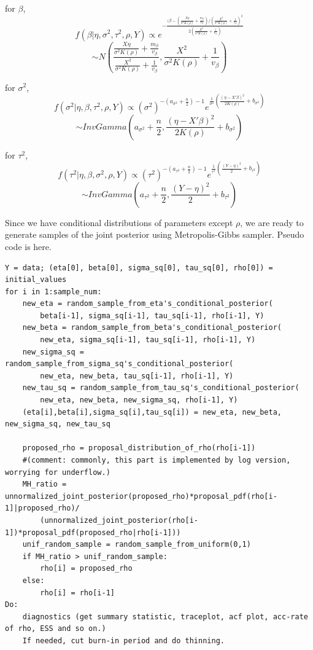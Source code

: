 \documentclass{article}
\begin{document}
for $\beta$,
\[f(\beta|\eta,\sigma^2,\tau^2,\rho,Y) \propto e^{-\frac{(\beta - (\frac{X\eta}{\sigma^2 K(\rho)} + \frac{m_\beta}{v_\beta}) / (\frac{X^2}{\sigma^2 K(\rho)}+\frac{1}{v_\beta})^2}{2(\frac{X^2}{\sigma^2 K(\rho)}+\frac{1}{v_\beta})}}
\]
\[\sim N(\frac{\frac{X\eta}{\sigma^2 K(\rho)} + \frac{m_\beta}{v_\beta}}{\frac{X^2}{\sigma^2 K(\rho)}+\frac{1}{v_\beta}}, \frac{X^2}{\sigma^2 K(\rho)}+\frac{1}{v_\beta})\]

for $\sigma^2$,
\[f(\sigma^2|\eta,\beta,\tau^2,\rho,Y) \propto (\sigma^2)^{-(a_{\sigma^2}+\frac{n}{2})-1} e^{\frac{1}{\sigma^2}(\frac{(\eta - X'\beta)^2}{2K(\rho)}+b_{\sigma^2})}
\]
\[\sim InvGamma(a_{\sigma^2}+\frac{n}{2}, \frac{(\eta - X'\beta)^2}{2K(\rho)}+b_{\sigma^2})\]

for $\tau^2$,
\[f(\tau^2|\eta,\beta,\sigma^2,\rho,Y) \propto (\tau^2)^{-(a_{\tau^2}+\frac{n}{2})-1} e^{\frac{1}{\tau^2}(\frac{(Y - \eta)^2}{2}+b_{\tau^2})}
\]
\[\sim InvGamma(a_{\tau^2}+\frac{n}{2}, \frac{(Y - \eta)^2}{2}+b_{\tau^2})\]


Since we have conditional distributions of parameters except $\rho$,
we are ready to generate samples of the joint posterior using Metropolis-Gibbs sampler.
Pseudo code is here.
\begin{mdframed}
    \begin{small}
        \begin{verbatim}
Y = data; (eta[0], beta[0], sigma_sq[0], tau_sq[0], rho[0]) = initial_values
for i in 1:sample_num:
    new_eta = random_sample_from_eta's_conditional_posterior(
        beta[i-1], sigma_sq[i-1], tau_sq[i-1], rho[i-1], Y)
    new_beta = random_sample_from_beta's_conditional_posterior(
        new_eta, sigma_sq[i-1], tau_sq[i-1], rho[i-1], Y)
    new_sigma_sq = random_sample_from_sigma_sq's_conditional_posterior(
        new_eta, new_beta, tau_sq[i-1], rho[i-1], Y)
    new_tau_sq = random_sample_from_tau_sq's_conditional_posterior(
        new_eta, new_beta, new_sigma_sq, rho[i-1], Y)
    (eta[i],beta[i],sigma_sq[i],tau_sq[i]) = new_eta, new_beta, new_sigma_sq, new_tau_sq

    proposed_rho = proposal_distribution_of_rho(rho[i-1])
    #(comment: commonly, this part is implemented by log version, worrying for underflow.)
    MH_ratio = unnormalized_joint_posterior(proposed_rho)*proposal_pdf(rho[i-1]|proposed_rho)/
        (unnormalized_joint_posterior(rho[i-1])*proposal_pdf(proposed_rho|rho[i-1]))
    unif_random_sample = random_sample_from_uniform(0,1)
    if MH_ratio > unif_random_sample:
        rho[i] = proposed_rho
    else:
        rho[i] = rho[i-1]
Do:
    diagnostics (get summary statistic, traceplot, acf plot, acc-rate of rho, ESS and so on.)
    If needed, cut burn-in period and do thinning.
        \end{verbatim}
    \end{small}
\end{mdframed}
\end{document}
